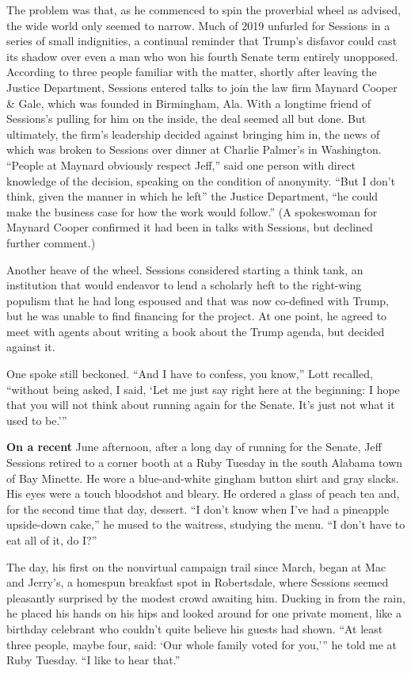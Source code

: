 The problem was that, as he commenced to spin the proverbial wheel as
advised, the wide world only seemed to narrow. Much of 2019 unfurled for
Sessions in a series of small indignities, a continual reminder that
Trump's disfavor could cast its shadow over even a man who won his
fourth Senate term entirely unopposed. According to three people
familiar with the matter, shortly after leaving the Justice Department,
Sessions entered talks to join the law firm Maynard Cooper \& Gale,
which was founded in Birmingham, Ala. With a longtime friend of
Sessions's pulling for him on the inside, the deal seemed all but done.
But ultimately, the firm's leadership decided against bringing him in,
the news of which was broken to Sessions over dinner at Charlie Palmer's
in Washington. ``People at Maynard obviously respect Jeff,'' said one
person with direct knowledge of the decision, speaking on the condition
of anonymity. ``But I don't think, given the manner in which he left''
the Justice Department, ``he could make the business case for how the
work would follow.'' (A spokeswoman for Maynard Cooper confirmed it had
been in talks with Sessions, but declined further comment.)

Another heave of the wheel. Sessions considered starting a think tank,
an institution that would endeavor to lend a scholarly heft to the
right-wing populism that he had long espoused and that was now
co-defined with Trump, but he was unable to find financing for the
project. At one point, he agreed to meet with agents about writing a
book about the Trump agenda, but decided against it.

One spoke still beckoned. ``And I have to confess, you know,'' Lott
recalled, ``without being asked, I said, `Let me just say right here at
the beginning: I hope that you will not think about running again for
the Senate. It's just not what it used to be.'''

\textbf{On a recent} June afternoon, after a long day of running for the
Senate, Jeff Sessions retired to a corner booth at a Ruby Tuesday in the
south Alabama town of Bay Minette. He wore a blue-and-white gingham
button shirt and gray slacks. His eyes were a touch bloodshot and
bleary. He ordered a glass of peach tea and, for the second time that
day, dessert. ``I don't know when I've had a pineapple upside-down
cake,'' he mused to the waitress, studying the menu. ``I don't have to
eat all of it, do I?''

The day, his first on the nonvirtual campaign trail since March, began
at Mac and Jerry's, a homespun breakfast spot in Robertsdale, where
Sessions seemed pleasantly surprised by the modest crowd awaiting him.
Ducking in from the rain, he placed his hands on his hips and looked
around for one private moment, like a birthday celebrant who couldn't
quite believe his guests had shown. ``At least three people, maybe four,
said: `Our whole family voted for you,''' he told me at Ruby Tuesday.
``I like to hear that.''

